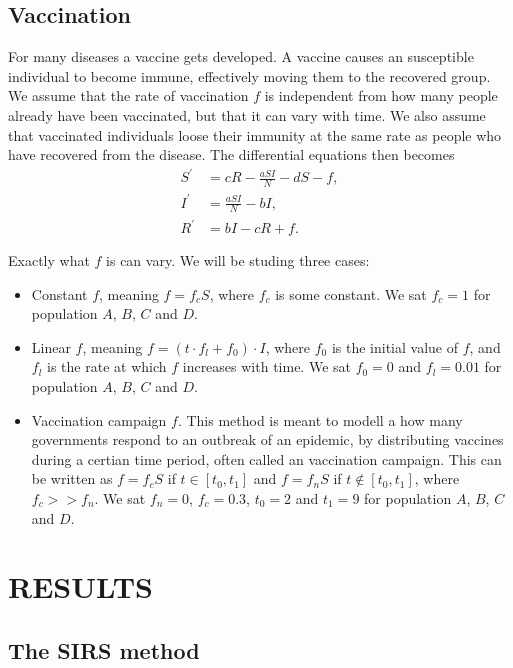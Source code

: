 \documentclass[a4paper]{article}
\let\Oldsection\section
\renewcommand{\section}{\FloatBarrier\Oldsection}
\let\Oldsubsection\subsection
\renewcommand{\subsection}{\FloatBarrier\Oldsubsection}
\begin{document}
\subsection{Vaccination}

For many diseases a vaccine gets developed. A vaccine causes an susceptible individual to become immune, effectively moving them to the recovered group. We assume that the rate of vaccination $f$ is independent from how many people already have been vaccinated, but that it can vary with time. We also assume that vaccinated individuals loose their immunity at the same rate as people who have recovered from the disease. The differential equations then becomes
\begin{align} 
S ^ { \prime } & = c R - \frac { a S I } { N } - d S -f, \\ 
I ^ { \prime } & = \frac { a S I } { N } - b I , \\ 
R ^ { \prime } & = b I - c R + f.
\end{align}

Exactly what $f$ is can vary. We will be studing three cases:
\begin{itemize}
	\item Constant $f$, meaning $f = f_c S$, where $f_c$ is some constant. We sat $f_c = 1$ for population $A$, $B$, $C$ and $D$.
	\item Linear $f$, meaning $f = (t \cdot f_l + f_0) \cdot I$, where $f_0$ is the initial value of $f$, and $f_l$ is the rate at which $f$ increases with time. We sat $f_0 = 0$ and $f_l = 0.01$ for population $A$, $B$, $C$ and $D$.
	\item Vaccination campaign $f$. This method is meant to modell a how many governments respond to an outbreak of an epidemic, by distributing vaccines during a certian time period, often called an vaccination campaign. This can be written as $f = f_c S$ if $t \in [t_0,t_1]$ and $f = f_n S$ if $t \notin [t_0,t_1]$, where $f_c >> f_n$. We sat $f_n=0$, $f_c=0.3$, $t_0=2$ and $t_1=9$ for population $A$, $B$, $C$ and $D$. 
\end{itemize}

\section{RESULTS}

\subsection{The SIRS method}
\end{document}
